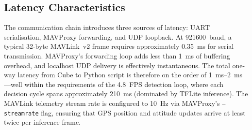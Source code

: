 \subsection{Latency Characteristics}\label{sec:latency}

The communication chain introduces three sources of latency: UART serialisation, MAVProxy forwarding, and UDP loopback. At \SI{921600}{baud}, a typical 32-byte MAVLink~v2 frame requires approximately \SI{0.35}{\milli\second} for serial transmission. MAVProxy's forwarding loop adds less than \SI{1}{\milli\second} of buffering overhead, and localhost UDP delivery is effectively instantaneous. The total one-way latency from Cube to Python script is therefore on the order of \SIrange{1}{2}{\milli\second}---well within the requirements of the \SI{4.8}{FPS} detection loop, where each decision cycle spans approximately \SI{210}{\milli\second} (dominated by TFLite inference). The MAVLink telemetry stream rate is configured to \SI{10}{\hertz} via MAVProxy's \texttt{--streamrate} flag, ensuring that GPS position and attitude updates arrive at least twice per inference frame.
